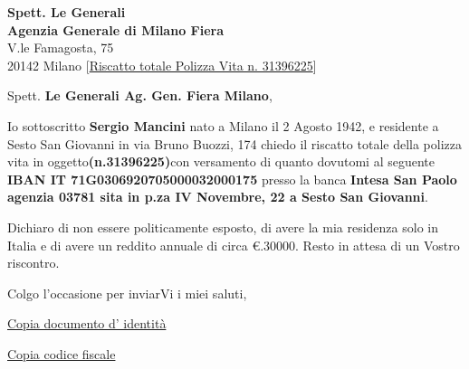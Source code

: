 \documentclass[12pt,a4paper,boldsubject,italicsignature,smartindent]{letteracdp}
\begin{document}
\begin{letter}{\textbf{Spett. Le Generali} \\
\textbf{Agenzia Generale di Milano Fiera} \\
V.le Famagosta, 75\\
20142 Milano\bigskip\bigskip\bigskip\bigskip\bigskip\bigskip\bigskip}%
[\underline{Riscatto totale Polizza Vita n. 31396225}]
\opening{Spett. \textbf{Le Generali Ag. Gen. Fiera Milano},}
Io sottoscritto \textbf{Sergio Mancini} nato a Milano il 2 Agosto 1942, e residente a Sesto San Giovanni in via Bruno Buozzi, 174  chiedo il riscatto totale della polizza vita in oggetto\textbf{(n.31396225)}con versamento di quanto dovutomi al seguente \textbf{IBAN IT	71G0306920705000032000175} presso la banca \textbf{Intesa San Paolo agenzia 03781 sita in p.za IV Novembre, 22 a Sesto San Giovanni}.

Dichiaro di non essere politicamente esposto, di avere la mia residenza solo in Italia e di avere un reddito annuale di circa €.30000.
Resto in attesa di un  Vostro riscontro.
\closing{Colgo l'occasione per inviarVi i miei saluti,}

\begin{enclosures}
	\item \underline{Copia documento d' identità }
	\item \underline{Copia codice fiscale}
\end{enclosures}
\end{letter}
\end{document}
